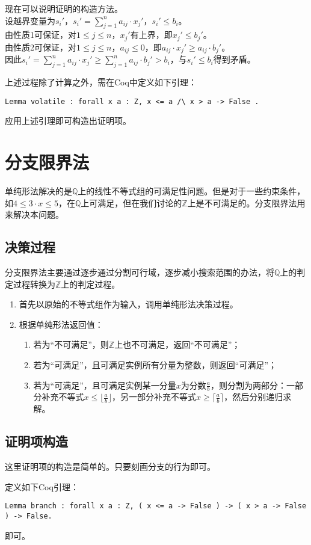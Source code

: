 现在可以说明证明的构造方法。\\
设越界变量为$s_i'$，$s_i' = \sum_{j=1}^{n} a_{ij} \cdot x_j'$，$s_i' \leq b_i$。\\
由性质1可保证，对$1 \leq j \leq n$，$x_j'$有上界，即$x_j' \leq b_j'$。\\
由性质2可保证，对$1 \leq j \leq n$，$a_{ij} \leq 0$，即$a_{ij} \cdot x_j' \geq a_{ij} \cdot b_j'$。\\
因此$s_i' = \sum_{j=1}^{n} a_{ij} \cdot x_j' \geq \sum_{j=1}^{n} a_{ij} \cdot b_j' > b_i$，与$s_i' \leq b_i$得到矛盾。

上述过程除了计算之外，需在Coq中定义如下引理：
\begin{verbatim}
Lemma volatile : forall x a : Z, x <= a /\ x > a -> False .
\end{verbatim}
应用上述引理即可构造出证明项。

\section{分支限界法}
单纯形法解决的是$\mathbb{Q}$上的线性不等式组的可满足性问题。但是对于一些约束条件，如$4 \leq 3 \cdot x \leq 5$，在$\mathbb{Q}$上可满足，但在我们讨论的$\mathbb{Z}$上是不可满足的。分支限界法用来解决本问题。
\subsection{决策过程}
分支限界法主要通过逐步通过分割可行域，逐步减小搜索范围的办法，将$\mathbb{Q}$上的判定过程转换为$\mathbb{Z}$上的判定过程。
\begin{enumerate}
  \item 首先以原始的不等式组作为输入，调用单纯形法决策过程。
  \item 根据单纯形法返回值：
    \begin{enumerate}
      \item 若为``不可满足''，则$\mathbb{Z}$上也不可满足，返回``不可满足''；
      \item 若为``可满足''，且可满足实例所有分量为整数，则返回``可满足''；
      \item 若为``可满足''，且可满足实例某一分量$x$为分数$\frac{a}{b}$，则分割为两部分：一部分补充不等式$x \leq \lfloor \frac{a}{b} \rfloor$，另一部分补充不等式$x \geq \lceil \frac{a}{b} \rceil$，然后分别递归求解。
    \end{enumerate}
\end{enumerate}

\subsection{证明项构造}
这里证明项的构造是简单的。只要刻画分支的行为即可。

定义如下Coq引理：
\begin{verbatim}
Lemma branch : forall x a : Z, ( x <= a -> False ) -> ( x > a -> False ) -> False.
\end{verbatim}
即可。
